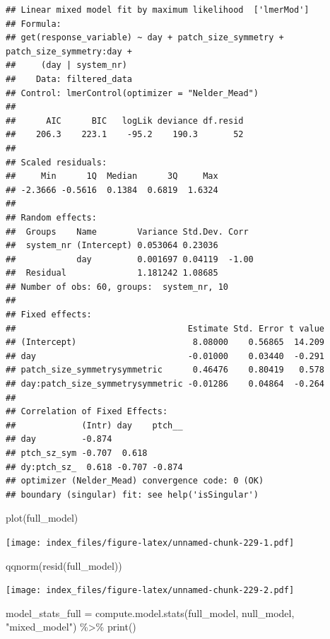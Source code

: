 \documentclass[
]{article}
\newenvironment{Shaded}{\begin{snugshade}}{\end{snugshade}}
\newcommand{\FunctionTok}[1]{\textcolor[rgb]{0.00,0.00,0.00}{#1}}
\newcommand{\NormalTok}[1]{#1}
\newcommand{\OtherTok}[1]{\textcolor[rgb]{0.56,0.35,0.01}{#1}}
\newcommand{\SpecialCharTok}[1]{\textcolor[rgb]{0.00,0.00,0.00}{#1}}
\newcommand{\StringTok}[1]{\textcolor[rgb]{0.31,0.60,0.02}{#1}}
\begin{document}
\begin{verbatim}
## Linear mixed model fit by maximum likelihood  ['lmerMod']
## Formula: 
## get(response_variable) ~ day + patch_size_symmetry + patch_size_symmetry:day +  
##     (day | system_nr)
##    Data: filtered_data
## Control: lmerControl(optimizer = "Nelder_Mead")
## 
##      AIC      BIC   logLik deviance df.resid 
##    206.3    223.1    -95.2    190.3       52 
## 
## Scaled residuals: 
##     Min      1Q  Median      3Q     Max 
## -2.3666 -0.5616  0.1384  0.6819  1.6324 
## 
## Random effects:
##  Groups    Name        Variance Std.Dev. Corr 
##  system_nr (Intercept) 0.053064 0.23036       
##            day         0.001697 0.04119  -1.00
##  Residual              1.181242 1.08685       
## Number of obs: 60, groups:  system_nr, 10
## 
## Fixed effects:
##                                  Estimate Std. Error t value
## (Intercept)                       8.08000    0.56865  14.209
## day                              -0.01000    0.03440  -0.291
## patch_size_symmetrysymmetric      0.46476    0.80419   0.578
## day:patch_size_symmetrysymmetric -0.01286    0.04864  -0.264
## 
## Correlation of Fixed Effects:
##             (Intr) day    ptch__
## day         -0.874              
## ptch_sz_sym -0.707  0.618       
## dy:ptch_sz_  0.618 -0.707 -0.874
## optimizer (Nelder_Mead) convergence code: 0 (OK)
## boundary (singular) fit: see help('isSingular')
\end{verbatim}

\begin{Shaded}
\begin{Highlighting}[]
\FunctionTok{plot}\NormalTok{(full\_model)}
\end{Highlighting}
\end{Shaded}

\texttt{[image: index\_files/figure-latex/unnamed-chunk-229-1.pdf]}

\begin{Shaded}
\begin{Highlighting}[]
\FunctionTok{qqnorm}\NormalTok{(}\FunctionTok{resid}\NormalTok{(full\_model))}
\end{Highlighting}
\end{Shaded}

\texttt{[image: index\_files/figure-latex/unnamed-chunk-229-2.pdf]}

\begin{Shaded}
\begin{Highlighting}[]
\NormalTok{model\_stats\_full }\OtherTok{=} \FunctionTok{compute.model.stats}\NormalTok{(full\_model,}
\NormalTok{                                       null\_model,}
                                       \StringTok{"mixed\_model"}\NormalTok{) }\SpecialCharTok{\%\textgreater{}\%}
  \FunctionTok{print}\NormalTok{()}
\end{Highlighting}
\end{Shaded}
\end{document}

